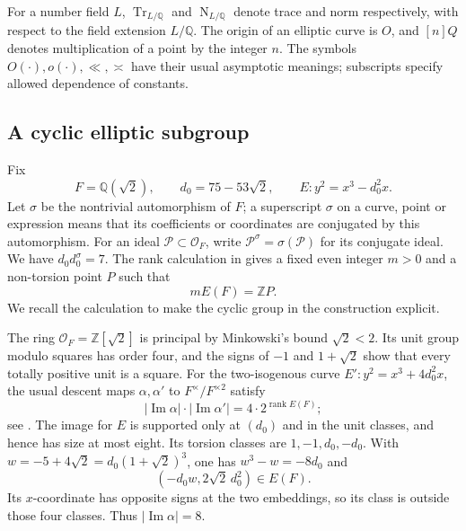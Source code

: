 \documentclass[11pt,reqno]{amsart}
\theoremstyle{definition}
\numberwithin{equation}{section}
\newcommand{\Q}{\mathbb Q}
\newcommand{\Z}{\mathbb Z}
\newcommand{\OO}{\mathcal O}
\newcommand{\Nm}{\operatorname{N}}
\newcommand{\Tr}{\operatorname{Tr}}
\newcommand{\im}{\operatorname{Im}}
\begin{document}
 For a number field $L$, $\Tr_{L/\Q}$ and $\Nm_{L/\Q}$ denote trace and norm respectively,  with respect to the field extension $L/\Q$. The origin of an elliptic curve is $O$, and $[n]Q$ denotes multiplication of a point by the integer $n$. The symbols $O(\cdot),o(\cdot),\ll,\asymp$ have their usual asymptotic meanings; subscripts specify allowed dependence of constants.

\subsection{A cyclic elliptic subgroup}
Fix
\begin{equation}\label{eq:curve}
 F=\Q(\sqrt2),\qquad d_0=75-53\sqrt2,\qquad
 E:y^2=x^3-d_0^2x.
\end{equation}
Let $\sigma$ be the nontrivial automorphism of $F$; a superscript $\sigma$ on a curve, point or expression means that its coefficients or coordinates are conjugated by this automorphism. 
For an ideal $\mathcal P\subset\OO_F$, write $\mathcal P^\sigma=\sigma(\mathcal P)$ for its conjugate ideal.
We have $d_0d_0^\sigma=7$. The rank calculation in \cite[Section 5]{OAI} gives a fixed even integer $m>0$ and a non-torsion point $P$ such that
\begin{equation}\label{eq:cyclic}
 mE(F)=\Z P.
\end{equation}
We recall the calculation to make the cyclic group in the construction explicit.

The ring $\OO_F=\Z[\sqrt2]$ is principal by Minkowski's bound $\sqrt2<2$. Its unit group modulo squares has order four, and the signs of $-1$ and $1+\sqrt2$ show that every totally positive unit is a square. For the two-isogenous curve $E':y^2=x^3+4d_0^2x$, the usual descent maps $\alpha,\alpha'$ to $F^\times/F^{\times2}$ satisfy
\[
 |\im\alpha|\cdot|\im\alpha'|=4\cdot2^{\operatorname{rank}E(F)};
\]
see \cite[Chapter X, Section 4]{Silv}. The image for $E$ is supported only at $(d_0)$ and in the unit classes, and hence has size at most eight. Its torsion classes are $1,-1,d_0,-d_0$. With $w=-5+4\sqrt2=d_0(1+\sqrt2)^3$, one has $w^3-w=-8d_0$ and
\[
 (-d_0w,2\sqrt2\,d_0^2)\in E(F).
\]
Its $x$-coordinate has opposite signs at the two embeddings, so its class is outside those four classes. Thus $|\im\alpha|=8$.
\end{document}

